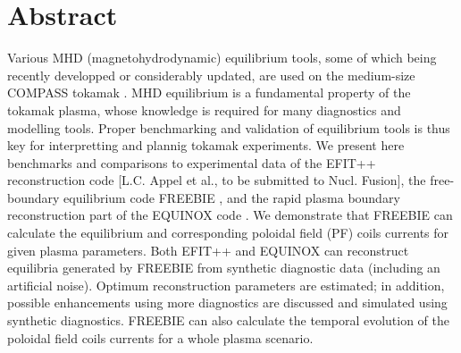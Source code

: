 \section{Abstract}

Various MHD (magnetohydrodynamic) equilibrium tools, some of which being recently developped or considerably updated, are used on the medium-size COMPASS tokamak \cite{P_nek_2006}. MHD equilibrium is a fundamental property of the tokamak plasma, whose knowledge is required for many diagnostics and modelling tools. Proper benchmarking and validation of equilibrium tools is thus key for interpretting and plannig tokamak experiments. We present here benchmarks and comparisons to experimental data of the EFIT++ reconstruction code [L.C. Appel et al., to be submitted to Nucl. Fusion], the free-boundary equilibrium code FREEBIE \cite{freebie2012}, and the rapid plasma boundary reconstruction part of the EQUINOX code \cite{Blum_2012}. We demonstrate that FREEBIE can calculate the equilibrium and corresponding poloidal field (PF) coils currents for given plasma parameters. Both EFIT++ and EQUINOX can reconstruct equilibria generated by FREEBIE from synthetic diagnostic data (including an artificial noise). Optimum reconstruction parameters are estimated; in addition, possible enhancements using more diagnostics are discussed and simulated using synthetic diagnostics. FREEBIE can also calculate the temporal evolution of the poloidal field coils currents for a whole plasma scenario.
